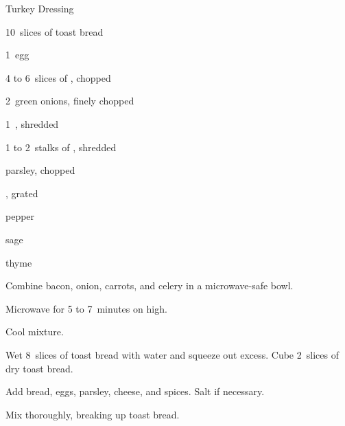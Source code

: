 \begin{recipe}{Turkey Dressing}{}{}

\begin{ingredients}
\item 10~slices of toast bread
\item 1~egg
\item 4 to 6~slices of , chopped
\item 2~green onions, finely chopped
\item 1~, shredded
\item 1 to 2~stalks of , shredded
\item \C{\quarter} parsley, chopped
\item \C{\quarter} , grated
\item pepper
\item sage
\item thyme
\end{ingredients}

\begin{directions}
\item Combine bacon, onion, carrots, and celery in a microwave-safe bowl.
\item Microwave for 5 to 7~minutes on high.
\item Cool mixture.
\item Wet 8~slices of toast bread with water and squeeze out excess. Cube 2~slices of dry toast bread.
\item Add bread, eggs, parsley, cheese, and spices. Salt if necessary.
\item Mix thoroughly, breaking up toast bread.
\end{directions}

\end{recipe}
